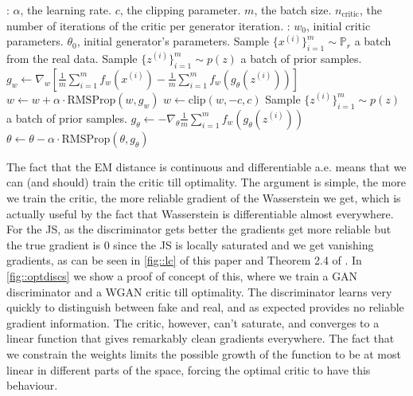 \documentclass{article} %
\newcommand\PP{\mathbb{P}}
\theoremstyle{definition}
\theoremstyle{definition}
\begin{document}
\begin{algorithm}[t!]
  \caption{WGAN, our proposed algorithm. All experiments in the paper
used the default values $\alpha = 0.00005$, $c = 0.01$, $m=64$, $n_{\text{critic}}=5$.}\label{algo::wgan}
  \begin{algorithmic}[1]
    \Require: $\alpha$, the learning rate. $c$, the clipping parameter. $m$, the
      batch size. $n_{\text{critic}}$, the number of iterations of the critic
      per generator iteration.
    \Require: $w_0$, initial critic parameters. $\theta_0$,
      initial generator's parameters.
        \State Sample $\{x^{(i)}\}_{i=1}^m \sim \PP_r$ a batch from the real data.
        \State Sample $\{z^{(i)}\}_{i=1}^m \sim p(z)$ a batch of prior samples.
        \State $g_w \gets \nabla_w \left[\frac{1}{m}\sum_{i=1}^m f_w(x^{(i)}) - \frac{1}{m} \sum_{i=1}^m f_w(g_\theta(z^{(i)})) \right]$
        \State $w \gets w + \alpha \cdot \text{RMSProp}(w, g_w) $
        \State $w \gets \text{clip}(w, -c, c) $
      \EndFor
      \State Sample $\{z^{(i)}\}_{i=1}^m \sim p(z)$ a batch of prior samples.
      \State $g_\theta \gets -\nabla_\theta \frac{1}{m} \sum_{i=1}^m f_w(g_\theta(z^{(i)}))$ 
      \State $\theta \gets \theta - \alpha \cdot \text{RMSProp}(\theta, g_\theta)$
    \EndWhile
\end{algorithmic}
\end{algorithm}

The fact that the EM distance is continuous and differentiable a.e.
means that we can (and should) train
the critic till optimality. The argument is simple,
the more we train the critic, the more reliable gradient of
the Wasserstein we get, which is actually useful by the
fact that Wasserstein is differentiable almost everywhere.
For the JS, as the discriminator gets better the gradients get
more reliable but the true gradient is 0 since the JS is locally
saturated and we get vanishing gradients,
as can be seen in \autoref{fig::lc} of this paper
and Theorem 2.4 of \cite{Arj-ea-Princ}. In \autoref{fig::optdiscs}
we show a proof of concept of this, where we train
a GAN discriminator and a WGAN critic till optimality.
The discriminator learns very quickly to distinguish between
fake and real, and as expected provides no reliable gradient
information. The critic, however, can't saturate, and converges
to a linear function that gives remarkably clean gradients everywhere.
The fact that we constrain the weights limits the possible
growth of the function to be at most linear in different parts
of the space, forcing the optimal critic to have this behaviour.
\end{document}
